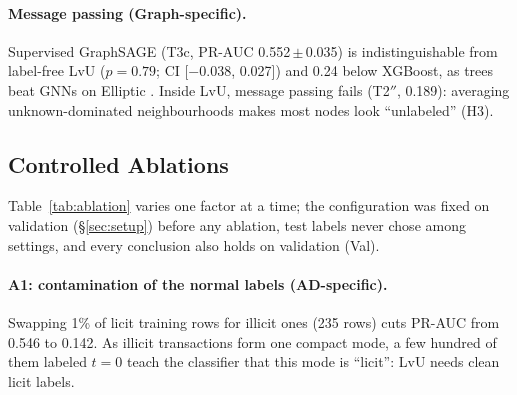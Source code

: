 \documentclass[11pt]{article}
\newcommand{\ours}{LvU}
\begin{document}
\paragraph{Message passing (Graph-specific).}
Supervised GraphSAGE (T3c, PR-AUC 0.552\,$\pm$\,0.035) is indistinguishable from label-free \ours{} ($p=0.79$; CI [$-$0.038, 0.027]) and 0.24 below XGBoost, as trees beat GNNs on Elliptic \citep{weber2019aml}.
Inside \ours{}, message passing fails (T2$''$, 0.189): averaging unknown-dominated neighbourhoods makes most nodes look ``unlabeled'' (H3).

\subsection{Controlled Ablations}
\label{sec:ablation}

\begin{table}[t]
\centering\small
\setlength{\tabcolsep}{3pt}

\caption{Ablations of \ours{}, one factor at a time: test PR-AUC (5 seeds; $\dagger$ bootstrap std), $\Delta$ vs.\ the full method, and validation PR-AUC (Val, mean). A3's IF uses the default \texttt{max\_samples}=256.}
\label{tab:ablation}
\end{table}

\begin{table}[t]
\centering\small

\caption{Failure cases of \ours{} (seed 0, $\tau=0.97027$; alert if $s\ge\tau$); the text refers to them by key \#1--\#4. RF = supervised Random Forest score (mean of seeds; mean $\tau\approx0.37$). Top SHAP = local feature L$k$ (\texttt{local\_}$k$) with the largest $|$TreeSHAP$|$: value (attribution in log-odds).}
\label{tab:cases}
\end{table}

Table~\ref{tab:ablation} varies one factor at a time; the configuration was fixed on validation (\S\ref{sec:setup}) before any ablation, test labels never chose among settings, and every conclusion also holds on validation (Val).

\paragraph{A1: contamination of the normal labels (AD-specific).}
Swapping 1\% of licit training rows for illicit ones (235 rows) cuts PR-AUC from 0.546 to 0.142.
As illicit transactions form one compact mode, a few hundred of them labeled $t=0$ teach the classifier that this mode is ``licit'': \ours{} needs clean licit labels.
\end{document}
